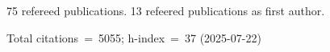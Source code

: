 75 refereed publications. 13 refeered publications as first author.

Total citations~=~5055; h-index~=~37 (2025-07-22)
